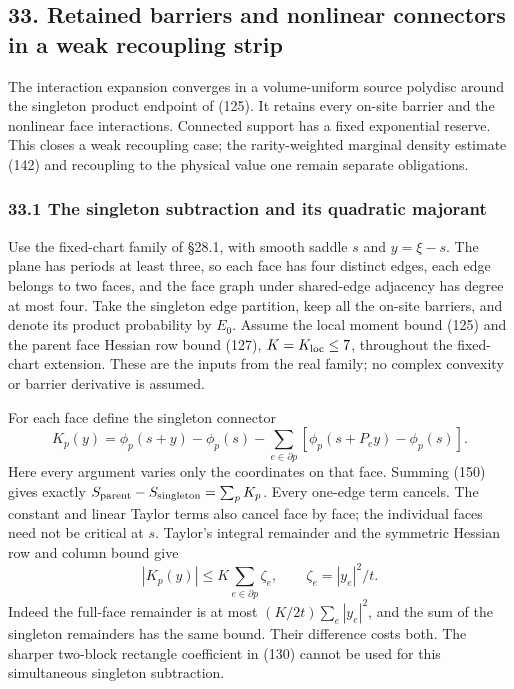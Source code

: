 \documentclass[11pt,a4paper]{article}
\begin{document}
\hypertarget{retained-barriers-and-nonlinear-connectors-in-a-weak-recoupling-strip}{%
\subsection{33. Retained barriers and nonlinear connectors in a weak
recoupling
strip}\label{retained-barriers-and-nonlinear-connectors-in-a-weak-recoupling-strip}}

The interaction expansion converges in a volume-uniform source polydisc
around the singleton product endpoint of (125). It retains every on-site
barrier and the nonlinear face interactions. Connected support has a
fixed exponential reserve. This closes a weak recoupling case; the
rarity-weighted marginal density estimate (142) and recoupling to the
physical value one remain separate obligations.

\hypertarget{the-singleton-subtraction-and-its-quadratic-majorant}{%
\subsubsection{33.1 The singleton subtraction and its quadratic
majorant}\label{the-singleton-subtraction-and-its-quadratic-majorant}}

Use the fixed-chart family of §28.1, with smooth saddle \(s\) and
\(y=\xi-s\). The plane has periods at least three, so each face has four
distinct edges, each edge belongs to two faces, and the face graph under
shared-edge adjacency has degree at most four. Take the singleton edge
partition, keep all the on-site barriers, and denote its product
probability by \(E_0\). Assume the local moment bound (125) and the
parent face Hessian row bound (127), \(K=K_{\rm loc}\le7\), throughout
the fixed-chart extension. These are the inputs from the real family; no
complex convexity or barrier derivative is assumed.

For each face define the singleton connector
\[K_p(y)=\phi_p(s+y)-\phi_p(s)
 -\sum_{e\in\partial p}
     [\phi_p(s+P_ey)-\phi_p(s)].\tag{150}\] Here every argument varies
only the coordinates on that face. Summing (150) gives exactly
\(S_{\rm parent}-S_{\rm singleton}=\sum_pK_p\). Every one-edge term
cancels. The constant and linear Taylor terms also cancel face by face;
the individual faces need not be critical at \(s\). Taylor's integral
remainder and the symmetric Hessian row and column bound give
\[|K_p(y)|\le K\sum_{e\in\partial p}\zeta_e,
\qquad \zeta_e=|y_e|^2/t.\tag{151}\] Indeed the full-face remainder is
at most \((K/2t)\sum_e|y_e|^2\), and the sum of the singleton remainders
has the same bound. Their difference costs both. The sharper two-block
rectangle coefficient in (130) cannot be used for this simultaneous
singleton subtraction.
\end{document}
